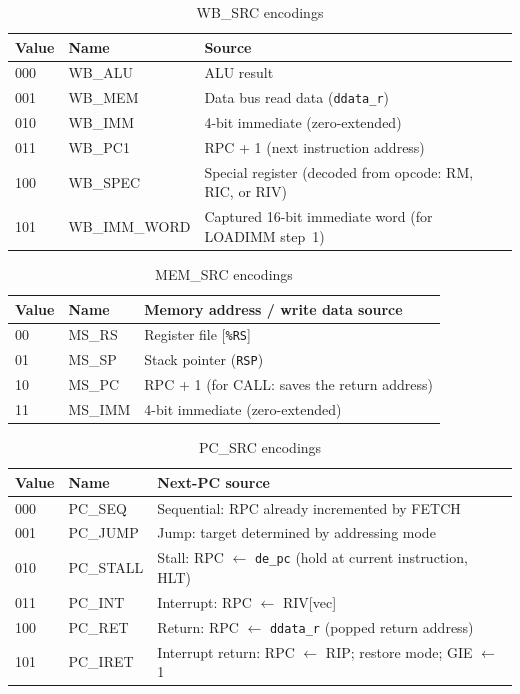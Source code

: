 \documentclass[a4paper,12pt]{report}
\newcommand{\asm}[1]{\texttt{#1}}
\newcommand{\field}[1]{\texttt{\small #1}}
\newcommand{\reg}[1]{\texttt{\%#1}}
\newcommand{\signal}[1]{\texttt{#1}}
\begin{document}
\begin{table}[htbp]
\centering
\caption{WB\_SRC encodings}
\label{tab:wbsrc}
\begin{tabularx}{\textwidth}{llX}
\toprule
\textbf{Value} & \textbf{Name} & \textbf{Source} \\
\midrule
000 & WB\_ALU      & ALU result \\
001 & WB\_MEM      & Data bus read data (\signal{ddata\_r}) \\
010 & WB\_IMM      & 4-bit immediate (zero-extended) \\
011 & WB\_PC1      & RPC + 1 (next instruction address) \\
100 & WB\_SPEC     & Special register (decoded from opcode: RM, RIC, or RIV) \\
101 & WB\_IMM\_WORD& Captured 16-bit immediate word (for LOADIMM step~1) \\
\bottomrule
\end{tabularx}
\end{table}

\begin{table}[htbp]
\centering
\caption{MEM\_SRC encodings}
\label{tab:memsrc}
\begin{tabularx}{\textwidth}{llX}
\toprule
\textbf{Value} & \textbf{Name} & \textbf{Memory address / write data source} \\
\midrule
00 & MS\_RS  & Register file [\reg{RS}] \\
01 & MS\_SP  & Stack pointer (\asm{RSP}) \\
10 & MS\_PC  & RPC + 1 (for CALL: saves the return address) \\
11 & MS\_IMM & 4-bit immediate (zero-extended) \\
\bottomrule
\end{tabularx}
\end{table}

\begin{table}[htbp]
\centering
\caption{PC\_SRC encodings}
\label{tab:pcsrc}
\begin{tabularx}{\textwidth}{llX}
\toprule
\textbf{Value} & \textbf{Name} & \textbf{Next-PC source} \\
\midrule
000 & PC\_SEQ   & Sequential: RPC already incremented by FETCH \\
001 & PC\_JUMP  & Jump: target determined by addressing mode \\
010 & PC\_STALL & Stall: RPC $\leftarrow$ \field{de\_pc} (hold at current instruction, HLT) \\
011 & PC\_INT   & Interrupt: RPC $\leftarrow$ RIV[vec] \\
100 & PC\_RET   & Return: RPC $\leftarrow$ \signal{ddata\_r} (popped return address) \\
101 & PC\_IRET  & Interrupt return: RPC $\leftarrow$ RIP; restore mode; GIE $\leftarrow$ 1 \\
\bottomrule
\end{tabularx}
\end{table}
\end{document}
